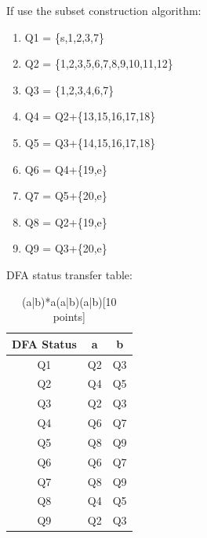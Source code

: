 \documentclass{article}
\begin{document}
            If use the subset construction algorithm:
            \begin{enumerate}[\qquad 1. ]
                \item Q1 = \{s,1,2,3,7\}
                \item Q2 = \{1,2,3,5,6,7,8,9,10,11,12\}
                \item Q3 = \{1,2,3,4,6,7\}
                \item Q4 = Q2+\{13,15,16,17,18\}
                \item Q5 = Q3+\{14,15,16,17,18\}
                \item Q6 = Q4+\{19,e\}
                \item Q7 = Q5+\{20,e\}
                \item Q8 = Q2+\{19,e\}
                \item Q9 = Q3+\{20,e\}
            \end{enumerate}

            DFA status transfer table:
                
                \begin{table}[!htbp]
                    \centering
                    \caption{(a|b)*a(a|b)(a|b)[10 points]}
                    \label{tab:aStrangeTable}
                    \begin{tabular}{ccc}
                        \hline
                        DFA Status  & a     & b     \\
                        \hline
                        Q1          & Q2    & Q3    \\
                        \hline
                        Q2          & Q4    & Q5    \\
                        \hline
                        Q3          & Q2    & Q3    \\
                        \hline
                        Q4          & Q6    & Q7    \\
                        \hline
                        Q5          & Q8    & Q9    \\
                        \hline
                        Q6          & Q6    & Q7    \\
                        \hline
                        Q7          & Q8    & Q9    \\
                        \hline
                        Q8          & Q4    & Q5    \\
                        \hline
                        Q9          & Q2    & Q3    \\    
                        \hline

                    \end{tabular}
                \end{table}
            
\end{document}
